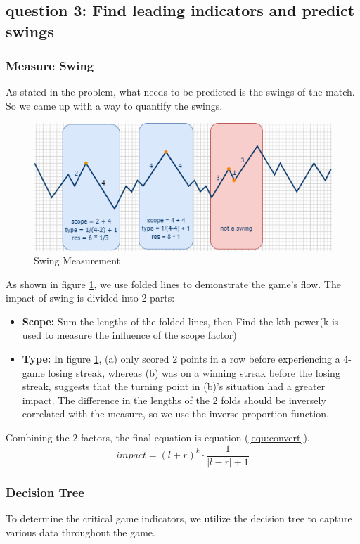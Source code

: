 \subsection{question 3: Find leading indicators and predict swings}

\subsubsection{Measure Swing}
As stated in the problem, what needs to be predicted is the swings of the match. So we came up with a way to quantify the swings. 
\begin{figure}[bt!]
    \centering
    \includegraphics[width=0.75\linewidth]{figure/convert.drawio.png}
    \caption{\centering Swing Measurement}
    \label{fig:swingM}
\end{figure}
As shown in figure \ref{fig:swingM}, we use folded lines to demonstrate the game's flow. The impact of swing is divided into 2 parts:
\begin{itemize}
    \item \textbf{Scope: }Sum the lengths of the folded lines, then Find the kth power(k is used to measure the influence of the scope factor)
    \item \textbf{Type: }In figure \ref{fig:swingM}, (a) only scored 2 points in a row before experiencing a 4-game losing streak, whereas (b) was on a winning streak before the losing streak, suggests that the turning point in (b)'s situation had a greater impact. The difference in the lengths of the 2 folds should be inversely correlated with the measure, so we use the inverse proportion function.
\end{itemize}

Combining the 2 factors, the final equation is equation (\ref{equ:convert}). 
\begin{equation}
    impact = (l+r)^k \cdot \frac{1}{|l-r|+1}
    \label{equ:convert}
\end{equation}

\subsubsection{Decision Tree}
To determine the critical game indicators, we utilize the decision tree to capture various data throughout the game. \par

